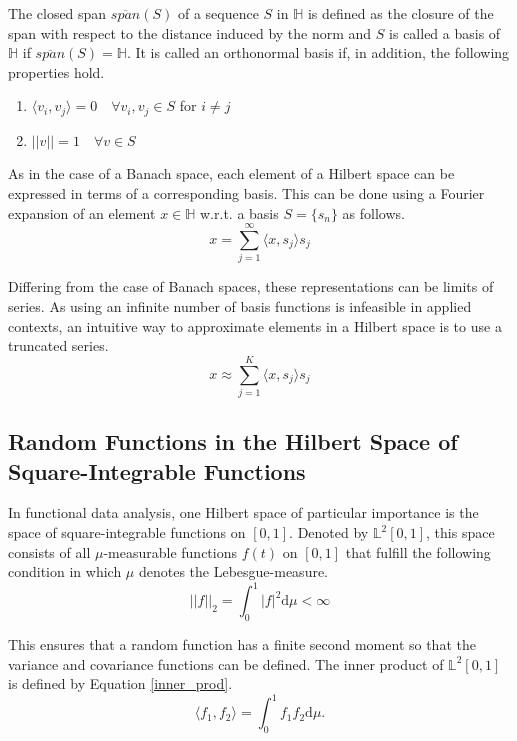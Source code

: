 \documentclass[11pt,twoside,a4paper]{article}
\begin{document}
	The closed span $\overline{span}(S)$ of a sequence $S$ in $\mathbb{H}$ is defined as the closure of the span with respect to the distance induced by the norm and $S$ is called a basis of $\mathbb{H}$ if $\overline{span}(S) = \mathbb{H}$.	It is called an orthonormal basis if, in addition, the following properties hold. 
	
	\begin{multicols}{2}
		\begin{enumerate}
			\item $\langle v_i, v_j \rangle = 0 \quad \forall v_i, v_j \in S $ for $i \neq j$
			\item $\lvert \lvert v \rvert \rvert = 1 \quad \forall v \in S$
		\end{enumerate}
	\end{multicols}

	As in the case of a Banach space, each element of a Hilbert space can be expressed in terms of a corresponding basis. This can be done using a Fourier expansion of an element $x \in \mathbb{H}$ w.r.t. a basis $S = \{s_n\}$ as follows.
	\begin{equation}
		x = \sum_{j = 1}^{\infty}{\langle x, s_j \rangle}s_j
	\end{equation}
	
	Differing from the case of Banach spaces, these representations can be limits of series. As using an infinite number of basis functions is infeasible in applied contexts, an intuitive way to approximate elements in a Hilbert space is to use a truncated series.
	\begin{equation}
		x \approx \sum_{j = 1}^{K}{\langle x, s_j \rangle}s_j
	\end{equation}
	
	\subsection{Random Functions in the Hilbert Space of Square-Integrable Functions}
	In functional data analysis, one Hilbert space of particular importance is the space of square-integrable functions on $[0,1]$. Denoted by $\mathbb{L}^2[0,1]$, this space consists of all $\mu$-measurable functions $f(t)$ on $[0,1]$ that fulfill the following condition in which $\mu$ denotes the Lebesgue-measure.
	\begin{equation}
		\lvert \lvert f \rvert \rvert_2 = \int_{0}^{1} \lvert f \rvert^2 \mathrm{d}\mu < \infty
	\end{equation}
	
	This ensures that a random function has a finite second moment so that the variance and covariance functions can be defined. The inner product of $\mathbb{L}^2[0,1]$ is defined by Equation \ref{inner_prod}.
	\begin{equation}\label{inner_prod}
		\langle f_1, f_2 \rangle = \int_{0}^{1} f_1 f_2 \mathrm{d}\mu.
	\end{equation}
	
\end{document}
